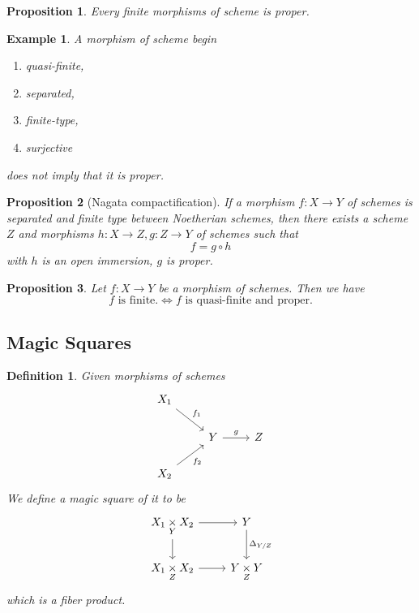 \documentclass{article}
\newtheorem{proposition}{Proposition}[section]
\newtheorem{definition}{Definition}[section]
\newtheorem{example}{Example}[section]
\numberwithin{equation}{section}
\newcommand{\fib}[1]{%
  \mathbin{\mathop{\times}\limits_{#1}}%
}
\begin{document}
\begin{proposition}
Every finite morphisms of scheme is proper.
\end{proposition}

\begin{example}
A morphism of scheme begin 
\begin{enumerate}
\item quasi-finite,
\item separated,
\item finite-type,
\item surjective
\end{enumerate}
does not imply that it is proper.
\end{example}

\begin{proposition}[Nagata compactification]
If a morphism $f:X\to Y$ of schemes is separated and finite type between Noetherian schemes, then there exists a scheme $Z$ and morphisms $h:X\to Z,g:Z\to Y$ of schemes such that 
\begin{equation*}
f = g\circ h
\end{equation*}
with $h$ is an open immersion, $g$ is proper.
\end{proposition}

\begin{proposition}
Let $f:X\to Y$ be a morphism of schemes. Then we have
\begin{equation*}
f\text{ is finite.}\Leftrightarrow f \text{ is quasi-finite and proper.}
\end{equation*}
\end{proposition}

\subsection{Magic Squares}

\begin{definition}
Given morphisms of schemes
\[
\begin{tikzcd}
X_1 \arrow[rd, "f_1"]  &                  &   \\
                       & Y \arrow[r, "g"] & Z \\
X_2 \arrow[ru, "f_2"'] &                  &  
\end{tikzcd}
\]
We define a magic square of it to be
\[
\begin{tikzcd}
X_1\fib{Y}X_2 \arrow[d] \arrow[r] & Y \arrow[d, "\Delta_{Y/Z}"] \\
X_1\fib{Z}X_2 \arrow[r]           & Y\fib{Z}Y                  
\end{tikzcd}
\]
which is a fiber product.
\end{definition}
\end{document}
